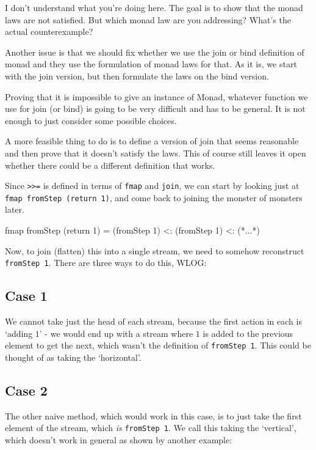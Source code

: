 \begin{vcomment}
I don't understand what you're doing here.
The goal is to show that the monad laws are not satisfied.
But which monad law are you addressing?
What's the actual counterexample?

Another issue is that we should fix whether we use the join or bind definition of monad and they use the formulation of monad laws for that.
As it is, we start with the join version, but then formulate the laws on the bind version.

Proving that it is impossible to give an instance of Monad, whatever function we use for join (or bind) is going to be very difficult and has to be general.
It is not enough to just consider some possible choices.

A more feasible thing to do is to define a version of join that seems reasonable and then prove that it doesn't satisfy the laws.
This of course still leaves it open whether there could be a different definition that works.
\end{vcomment}


Since \verb+>>=+ is defined in terms of \verb+fmap+ and \verb+join+, we can start by looking just at \verb+fmap fromStep (return 1)+, and come back to joining the monster of monsters later.
\begin{haskell}
fmap fromStep (return 1) = (fromStep 1) <: (fromStep 1) <: (*...*)
\end{haskell}

Now, to join (flatten) this into a single stream, we need to somehow reconstruct \verb+fromStep 1+. There are three ways to do this, WLOG:

\subsection{Case 1}
We cannot take just the head of each stream, because the first action in each is `adding $1$' - we would end up with a stream where $1$ is added to the previous element to get the next, which wasn't the definition of \verb+fromStep 1+. This could be thought of as taking the `horizontal'. 

\subsection{Case 2}
The other naive method, which would work in this case, is to just take the first element of the stream, which \emph{is} \verb+fromStep 1+. We call this taking the `vertical', which doesn't work in general as shown by another example:

